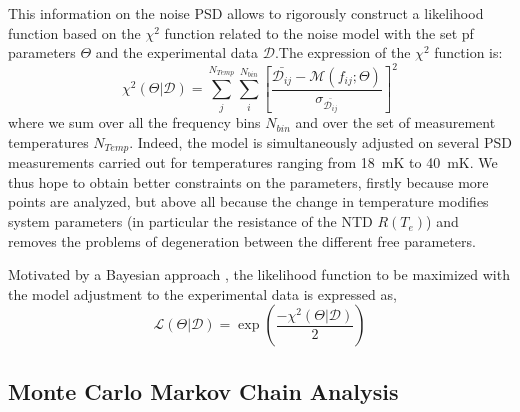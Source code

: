 This information on the noise PSD   allows to rigorously construct a likelihood function based on the $\chi^2$ function related to the noise model with the set pf parameters $\Theta$ and the experimental data $\mathcal{D}$.The expression of the $\chi^2$ function is:
\begin{equation}
\label{chi2}
\chi ^2 (\Theta|\mathcal{D}) = \sum^{N_{Temp}}_{j} \sum^{N_{bin}}_{i} \left[ \frac{\bar{\mathcal{D}_{ij}} - \mathcal{M}(f_{ij}; \Theta)}{\sigma_{\bar{\mathcal{D}_{ij}}}} \right]^2
\end{equation}
where we sum over all the frequency bins $N_{bin}$ and over the set of measurement temperatures $N_{Temp}$. Indeed, the model is simultaneously adjusted on several PSD measurements carried out for temperatures ranging from \SI{18}{\milli\kelvin} to \SI{40}{\milli\kelvin}. We thus hope to obtain better constraints on the parameters, firstly because more points are analyzed, but above all because the change in temperature modifies system parameters (in particular the resistance of the NTD $R(T_e)$) and removes the problems of degeneration between the different free parameters.

Motivated by a Bayesian approach
, the likelihood function to be maximized with the model adjustment to the experimental data is expressed as,
\begin{equation}
\label{likelihood}
\mathcal{L}(\Theta | \mathcal{D}) = \exp{\left(\frac{-\chi ^2 (\Theta|\mathcal{D})}{2}\right)}
\end{equation}

\subsection{Monte Carlo Markov Chain Analysis }


